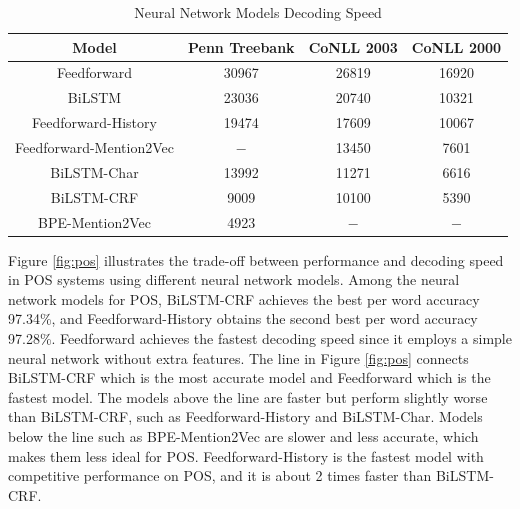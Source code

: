 \begin{table}[h]
\centering
\caption{Neural Network Models Decoding Speed}
\label{table:my-label2}
\begin{tabular}{|c|c|c|c|}
\hline
Model & Penn Treebank & CoNLL 2003 & CoNLL 2000\\ \hline
Feedforward    & 30967    & 26819   & 16920 \\ \hline
BiLSTM              & 23036    & 20740  & 10321    \\ \hline
Feedforward-History & 19474    & 17609  & 10067   \\
\hline
Feedforward-Mention2Vec     & $-$      & 13450 & 7601 \\ \hline
BiLSTM-Char         & 13992    & 11271  & 6616         \\ \hline
BiLSTM-CRF     & 9009     & 10100  & 5390     \\ \hline
BPE-Mention2Vec     & 4923  &  $-$  & $-$       \\ \hline   
\end{tabular}
\end{table}



Figure \ref{fig:pos} illustrates the trade-off between performance and decoding speed in POS systems using different neural network models. Among the neural network models for POS, BiLSTM-CRF achieves the best per word accuracy 97.34\%, and Feedforward-History obtains the second best per word accuracy 97.28\%. Feedforward achieves the fastest decoding speed since it employs a simple neural network without extra features. The line in Figure \ref{fig:pos} connects BiLSTM-CRF which is the most accurate model and Feedforward which is the fastest model. The models above the line are faster but perform slightly worse than BiLSTM-CRF, such as Feedforward-History and BiLSTM-Char. Models below the line such as BPE-Mention2Vec are slower and less accurate, which makes them less ideal for POS. Feedforward-History is the fastest model with competitive performance on POS, and it is about 2 times faster than BiLSTM-CRF.

